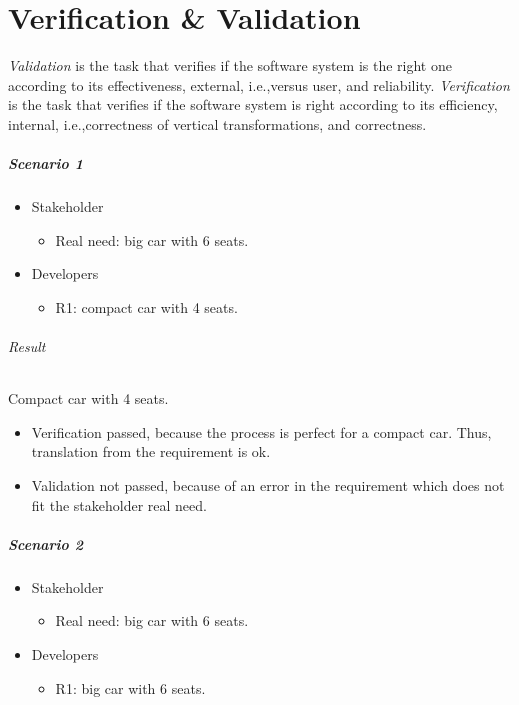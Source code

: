 \chapter{Verification \& Validation}
\emph{Validation} is the task that verifies if the software system is the right one according to its effectiveness, external, i.e.,\@  versus user, and reliability. \emph{Verification} is the task that verifies if the software system is right according to its efficiency, internal, i.e.,\@ correctness of vertical transformations, and correctness.

\paragraph{Scenario 1}
\begin{itemize}
\item Stakeholder
\begin{itemize}
\item Real need: big car with 6 seats.
\end{itemize}
\item Developers
\begin{itemize}
\item R1: compact car with 4 seats.
\end{itemize}
\end{itemize}

\subparagraph{Result}
Compact car with 4 seats.
\begin{itemize}
\item Verification passed, because the process is perfect for a compact car. Thus, translation from the requirement is ok.
\item Validation not passed, because of an error in the requirement which does not fit the stakeholder real need.
\end{itemize}

\paragraph{Scenario 2}
\begin{itemize}
\item Stakeholder
\begin{itemize}
\item Real need: big car with 6 seats.
\end{itemize}
\item Developers
\begin{itemize}
\item R1: big car with 6 seats.
\end{itemize}
\end{itemize}

